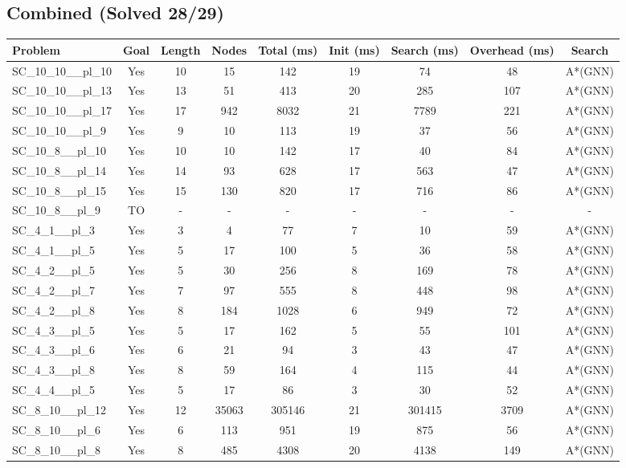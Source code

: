 \documentclass{article}
\begin{document}
\subsection*{Combined (Solved 28/29)}
\begin{tabular}{lcccccccc}
\toprule
Problem & Goal & Length & Nodes & Total (ms) & Init (ms) & Search (ms) & Overhead (ms) & Search \\
\midrule
SC\_10\_10\_\_pl\_10 & Yes & 10 & 15 & 142 & 19 & 74 & 48 & A*(GNN) \\
SC\_10\_10\_\_pl\_13 & Yes & 13 & 51 & 413 & 20 & 285 & 107 & A*(GNN) \\
SC\_10\_10\_\_pl\_17 & Yes & 17 & 942 & 8032 & 21 & 7789 & 221 & A*(GNN) \\
SC\_10\_10\_\_pl\_9 & Yes & 9 & 10 & 113 & 19 & 37 & 56 & A*(GNN) \\
SC\_10\_8\_\_pl\_10 & Yes & 10 & 10 & 142 & 17 & 40 & 84 & A*(GNN) \\
SC\_10\_8\_\_pl\_14 & Yes & 14 & 93 & 628 & 17 & 563 & 47 & A*(GNN) \\
SC\_10\_8\_\_pl\_15 & Yes & 15 & 130 & 820 & 17 & 716 & 86 & A*(GNN) \\
SC\_10\_8\_\_pl\_9 & TO & - & - & - & - & - & - & - \\
SC\_4\_1\_\_pl\_3 & Yes & 3 & 4 & 77 & 7 & 10 & 59 & A*(GNN) \\
SC\_4\_1\_\_pl\_5 & Yes & 5 & 17 & 100 & 5 & 36 & 58 & A*(GNN) \\
SC\_4\_2\_\_pl\_5 & Yes & 5 & 30 & 256 & 8 & 169 & 78 & A*(GNN) \\
SC\_4\_2\_\_pl\_7 & Yes & 7 & 97 & 555 & 8 & 448 & 98 & A*(GNN) \\
SC\_4\_2\_\_pl\_8 & Yes & 8 & 184 & 1028 & 6 & 949 & 72 & A*(GNN) \\
SC\_4\_3\_\_pl\_5 & Yes & 5 & 17 & 162 & 5 & 55 & 101 & A*(GNN) \\
SC\_4\_3\_\_pl\_6 & Yes & 6 & 21 & 94 & 3 & 43 & 47 & A*(GNN) \\
SC\_4\_3\_\_pl\_8 & Yes & 8 & 59 & 164 & 4 & 115 & 44 & A*(GNN) \\
SC\_4\_4\_\_pl\_5 & Yes & 5 & 17 & 86 & 3 & 30 & 52 & A*(GNN) \\
SC\_8\_10\_\_pl\_12 & Yes & 12 & 35063 & 305146 & 21 & 301415 & 3709 & A*(GNN) \\
SC\_8\_10\_\_pl\_6 & Yes & 6 & 113 & 951 & 19 & 875 & 56 & A*(GNN) \\
SC\_8\_10\_\_pl\_8 & Yes & 8 & 485 & 4308 & 20 & 4138 & 149 & A*(GNN) \\

\end{tabular}
\end{document}
